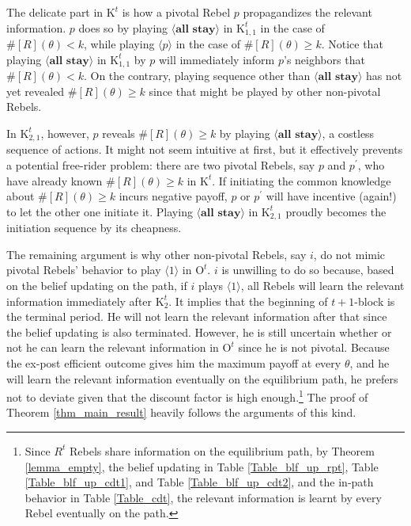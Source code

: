 \documentclass[12pt,letter]{article}
\newcommand{\Kappa}{\mathrm{K}}
\newcommand{\Omicron}{\mathrm{O}}
\theoremstyle{definition}
\theoremstyle{remark}
\theoremstyle{claim}
\begin{document}
\clearpage

The delicate part in $\Kappa^t$ is how a pivotal Rebel $p$ propagandizes the relevant information. $p$ does so by playing $\langle \textbf{all stay} \rangle$ in $\Kappa^{t}_{1,1}$ in the case of $\#[R](\theta)< k$, while playing $\langle p \rangle$ in the case of $\#[R](\theta)\geq k$. Notice that playing $\langle \textbf{all stay} \rangle$ in $\Kappa^{t}_{1,1}$ by $p$ will immediately inform $p$'s neighbors that $\#[R](\theta)< k$. On the contrary, playing sequence other than $\langle \textbf{all stay} \rangle$ has not yet revealed $\#[R](\theta)\geq k$ since that might be played by other non-pivotal Rebels. 

In $\Kappa^{t}_{2,1}$, however, $p$ reveals $\#[R](\theta)\geq k$ by playing $\langle \textbf{all stay} \rangle$, a costless sequence of actions. It might not seem intuitive at first, but it effectively prevents a potential free-rider problem: there are two pivotal Rebels, say $p$ and $p^{'}$, who have already known $\#[R](\theta)\geq k$ in $\Kappa^t$. If initiating the common knowledge about $\#[R](\theta)\geq k$ incurs negative payoff, $p$ or $p^{'}$ will have incentive (again!) to let the other one initiate it. Playing $\langle \textbf{all stay} \rangle$ in $\Kappa^t_{2,1}$ proudly becomes the initiation sequence by its cheapness.

The remaining argument is why other non-pivotal Rebels, say $i$, do not mimic pivotal Rebels' behavior to play $\langle 1 \rangle$ in $\Omicron^t$. $i$ is unwilling to do so because, based on the belief updating on the path, if $i$ plays $\langle 1 \rangle$, all Rebels will learn the relevant information immediately after $\Kappa^t_2$. It implies that the beginning of $t+1$-block is the terminal period. He will not learn the relevant information after that since the belief updating is also terminated. However, he is still uncertain whether or not he can learn the relevant information in $\Omicron^t$ since he is not pivotal. Because the ex-post efficient outcome gives him the maximum payoff at every $\theta$, and he will learn the relevant information eventually on the equilibrium path, he prefers not to deviate given that the discount factor is high enough.\footnote{Since $R^t$ Rebels share information on the equilibrium path, by Theorem \ref{lemma_empty}, the belief updating in Table \ref{Table_blf_up_rpt}, Table \ref{Table_blf_up_cdt1}, and Table \ref{Table_blf_up_cdt2}, and the in-path behavior in Table \ref{Table_cdt}, the relevant information is learnt by every Rebel eventually on the path.} 
The proof of Theorem \ref{thm_main_result} heavily follows the arguments of this kind.
\end{document}
